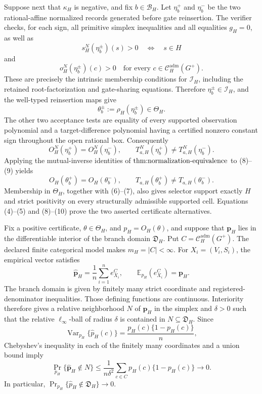Suppose next that \(\kappa_H\) is negative, and fix \(b\in\mathcal B_H\).  Let \(\eta_b^+\) and \(\eta_b^-\) be the two rational-affine normalized records generated before gate reinsertion.  The verifier checks, for each sign, all primitive simplex inequalities and all equalities \(g_H=0\), as well as
\[
 s_H^N(\eta_b^\pm)(s)>0\quad\Longleftrightarrow\quad s\in H
\tag{6}
\]
and
\[
 o_H^N(\eta_b^\pm)(c)>0
 \quad\text{for every }c\in\mathcal C_H^{\mathrm{adm}}(G^+).
\tag{7}
\]
These are precisely the intrinsic membership conditions for \(\mathcal I_H\), including the retained root-factorization and gate-sharing equations.  Therefore \(\eta_b^\pm\in\mathcal I_H\), and the well-typed reinsertion maps give
\[
 \theta_b^\pm:=\rho_H(\eta_b^\pm)\in\Theta_H.
\tag{8}
\]
The other two acceptance tests are equality of every supported observation polynomial and a target-difference polynomial having a certified nonzero constant sign throughout the open rational box.  Consequently
\[
 O_H^N(\eta_b^+)=O_H^N(\eta_b^-),
 \qquad
 T_{a,H}^N(\eta_b^+)\ne T_{a,H}^N(\eta_b^-).
\tag{9}
\]
Applying the mutual-inverse identities of \(\textnormal{thm:normalization-equivalence}\) to (8)--(9) yields
\[
 O_H(\theta_b^+)=O_H(\theta_b^-),
 \qquad
 T_{a,H}(\theta_b^+)\ne T_{a,H}(\theta_b^-).
\tag{10}
\]
Membership in \(\Theta_H\), together with (6)--(7), also gives selector support exactly \(H\) and strict positivity on every structurally admissible supported cell.  Equations (4)--(5) and (8)--(10) prove the two asserted certificate alternatives.

Fix a positive certificate, \(\theta\in\Theta_H\), and \(p_H=O_H(\theta)\), and suppose that \(\mathbf p_H\) lies in the differentiable interior of the branch domain \(\mathfrak D_H\).  Put \(C=\mathcal C_H^{\mathrm{adm}}(G^+)\).  The declared finite categorical model makes \(m_H=|C|<\infty\).  For \(X_i=(V_i,S_i)\), the empirical vector satisfies
\[
 \widehat{\mathbf p}_H=\frac1n\sum_{i=1}^n e_{X_i}^C,
 \qquad
 \mathbb E_{p_H}(e_{X_i}^C)=\mathbf p_H.
\tag{1}
\]
The branch domain is given by finitely many strict coordinate and registered-denominator inequalities.  Those defining functions are continuous.  Interiority therefore gives a relative neighborhood \(N\) of \(\mathbf p_H\) in the simplex and \(\delta>0\) such that the relative \(\ell_\infty\)-ball of radius \(\delta\) is contained in \(N\subseteq\mathfrak D_H\).  Since
\[
 \operatorname{Var}_{p_H}\{\widehat p_H(c)\}
 =\frac{p_H(c)\{1-p_H(c)\}}{n},
\]
Chebyshev's inequality in each of the finitely many coordinates and a union bound imply
\[
 \Pr_{p_H}\{\widehat{\mathbf p}_H\notin N\}
 \le
 \frac1{n\delta^2}\sum_{c\in C}p_H(c)\{1-p_H(c)\}
 \longrightarrow0.
\tag{2}
\]
In particular, \(\Pr_{p_H}\{\widehat p_H\notin\mathfrak D_H\}\to0\).

